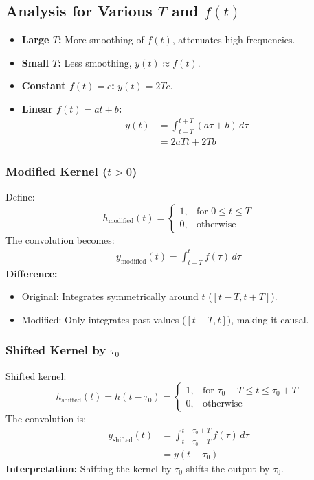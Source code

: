 \subsection{Analysis for Various $T$ and $f(t)$}
\begin{itemize}
    \item \textbf{Large $T$:} More smoothing of $f(t)$, attenuates high frequencies.
    \item \textbf{Small $T$:} Less smoothing, $y(t) \approx f(t)$.
    \item \textbf{Constant $f(t) = c$:} $y(t) = 2T c$.
    \item \textbf{Linear $f(t) = a t + b$:} 
    \begin{align*}
    y(t) &= \int_{t - T}^{t + T} (a \tau + b) \,d\tau \\
         &= 2a T t + 2T b
    \end{align*}
\end{itemize}

\subsubsection{Modified Kernel ($t > 0$)}
Define:
\[
h_{\text{modified}}(t)=
\begin{cases}
    1, & \text{for } 0 \leq t \leq T \\
    0, & \text{otherwise}
\end{cases}
\]
The convolution becomes:
\begin{align*}
y_{\text{modified}}(t) = \int_{t - T}^{t} f(\tau) \,d\tau
\end{align*}
\textbf{Difference:}
\begin{itemize}
    \item Original: Integrates symmetrically around $t$ ($[t - T, t + T]$).
    \item Modified: Only integrates past values ($[t - T, t]$), making it causal.
\end{itemize}

\subsubsection{Shifted Kernel by $\tau_0$}
Shifted kernel:
\[
h_{\text{shifted}}(t) = h(t - \tau_0) =
\begin{cases}
    1, & \text{for } \tau_0 - T \leq t \leq \tau_0 + T \\
    0, & \text{otherwise}
\end{cases}
\]
The convolution is:
\begin{align*}
y_{\text{shifted}}(t) &= \int_{t - \tau_0 - T}^{t - \tau_0 + T} f(\tau) \,d\tau \\
                      &= y(t - \tau_0)
\end{align*}
\textbf{Interpretation:} Shifting the kernel by $\tau_0$ shifts the output by $\tau_0$.

